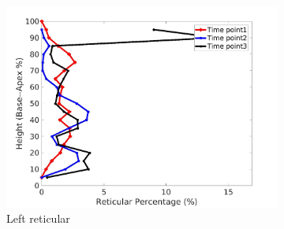 \begin{figure}[H]
\begin{subfigure}{.42\linewidth}
  \includegraphics[width=\linewidth,trim={{.0\wd0} {.0\wd0} {.0\wd0} {.0\wd0}},clip]{Appendix/Image_AppexA/BaseToApex/IPF2LeftLungReticularDiseaseAgainstHeight.jpg} %
  \caption{Left reticular}
  \label{fig:IPF2DiseaseAgainstHeight-c} 
\end{subfigure} 
\begin{subfigure}{.42\linewidth}%

\end{subfigure}
\end{figure}
